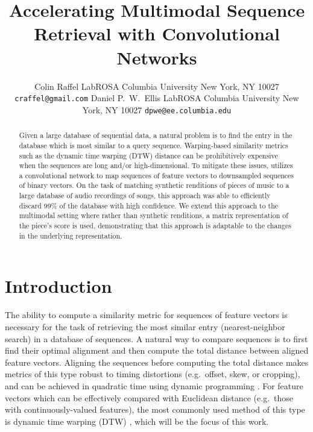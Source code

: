 \documentclass{article} %
\title{Accelerating Multimodal Sequence Retrieval with Convolutional Networks}
\author{
Colin Raffel
LabROSA
Columbia University
New York, NY 10027
\texttt{craffel@gmail.com}
\And
Daniel P.~W.~Ellis
LabROSA
Columbia University
New York, NY 10027
\texttt{dpwe@ee.columbia.edu}
}
\begin{document}
\maketitle

\begin{abstract}
Given a large database of sequential data, a natural problem is to find the entry in the database which is most similar to a query sequence.
Warping-based similarity metrics such as the dynamic time warping (DTW) distance can be prohibitively expensive when the sequences are long and/or high-dimensional.
To mitigate these issues, \cite{raffel2015large} utilizes a convolutional network to map sequences of feature vectors to downsampled sequences of binary vectors.
On the task of matching synthetic renditions of pieces of music to a large database of audio recordings of songs, this approach was able to efficiently discard 99\% of the database with high confidence.
We extend this approach to the multimodal setting where rather than synthetic renditions, a matrix representation of the piece's score is used, demonstrating that this approach is adaptable to the changes in the underlying representation.
\end{abstract}

\section{Introduction}
\label{sec:intro}

The ability to compute a similarity metric for sequences of feature vectors is necessary for the task of retrieving the most similar entry (nearest-neighbor search) in a database of sequences.
A natural way to compare sequences is to first find their optimal alignment and then compute the total distance between aligned feature vectors.
Aligning the sequences before computing the total distance makes metrics of this type robust to timing distortions (e.g.\ offset, skew, or cropping), and can be achieved in quadratic time using dynamic programming \cite{rakthanmanon2012searching}.
For feature vectors which can be effectively compared with Euclidean distance (e.g.\ those with continuously-valued features), the most commonly used method of this type is dynamic time warping (DTW) \cite{sakoe1978dynamic}, which will be the focus of this work.
\end{document}
